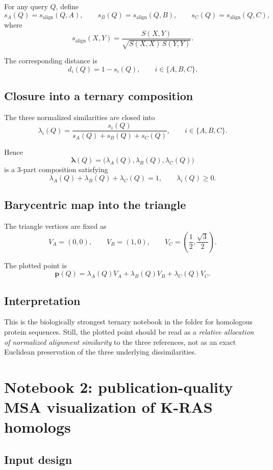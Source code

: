 \documentclass[11pt,a4paper]{article}
\begin{document}
For any query $Q$, define
\[
s_A(Q)=s_{\mathrm{align}}(Q,A),\qquad
s_B(Q)=s_{\mathrm{align}}(Q,B),\qquad
s_C(Q)=s_{\mathrm{align}}(Q,C),
\]
where
\[
s_{\mathrm{align}}(X,Y)=\frac{S(X,Y)}{\sqrt{S(X,X)\,S(Y,Y)}}.
\]

The corresponding distance is
\[
d_i(Q)=1-s_i(Q),\qquad i\in\{A,B,C\}.
\]

\subsection{Closure into a ternary composition}

The three normalized similarities are closed into
\[
\lambda_i(Q)=\frac{s_i(Q)}{s_A(Q)+s_B(Q)+s_C(Q)},\qquad i\in\{A,B,C\}.
\]

Hence
\[
\bm{\lambda}(Q)=\big(\lambda_A(Q),\lambda_B(Q),\lambda_C(Q)\big)
\]
is a 3-part composition satisfying
\[
\lambda_A(Q)+\lambda_B(Q)+\lambda_C(Q)=1,\qquad \lambda_i(Q)\ge 0.
\]

\subsection{Barycentric map into the triangle}

The triangle vertices are fixed as
\[
V_A=(0,0),\qquad
V_B=(1,0),\qquad
V_C=\left(\frac12,\frac{\sqrt3}{2}\right).
\]

The plotted point is
\[
\bm{p}(Q)=\lambda_A(Q)V_A+\lambda_B(Q)V_B+\lambda_C(Q)V_C.
\]

\subsection{Interpretation}

This is the biologically strongest ternary notebook in the folder for homologous protein sequences. Still, the plotted point should be read as a \emph{relative allocation of normalized alignment similarity} to the three references, not as an exact Euclidean preservation of the three underlying dissimilarities.

\section{Notebook 2: publication-quality MSA visualization of K-RAS homologs}

\subsection{Input design}
\end{document}
